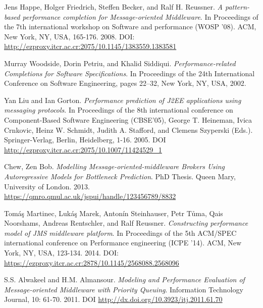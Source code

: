 \documentclass[article]{IEEEtran}
\begin{document}
\begin{thebibliography}{00}
 Jens Happe, Holger Friedrich, Steffen Becker, and Ralf H. Reussner. \emph{A pattern-based performance completion for Message-oriented Middleware}. In Proceedings of the 7th international workshop on Software and performance (WOSP '08). ACM, New York, NY, USA, 165-176. 2008. DOI: \url{http://ezproxy.itcr.ac.cr:2075/10.1145/1383559.1383581} 

 Murray Woodside, Dorin Petriu, and Khalid Siddiqui. \emph{Performance-related Completions for Software Specifications}. In Proceedings of the 24th International Conference on Software Engineering, pages 22–32, New York, NY, USA, 2002.


 Yan Liu and Ian Gorton. \emph{Performance prediction of J2EE applications using messaging protocols}. In Proceedings of the 8th international conference on Component-Based Software Engineering (CBSE'05), George T. Heineman, Ivica Crnkovic, Heinz W. Schmidt, Judith A. Stafford, and Clemens Szyperski (Eds.). Springer-Verlag, Berlin, Heidelberg, 1-16. 2005. DOI \url{http://ezproxy.itcr.ac.cr:2075/10.1007/11424529_1}

 Chew, Zen Bob. \emph{Modelling Message-oriented-middleware Brokers Using Autoregressive Models for Bottleneck Prediction}. PhD Thesis. Queen Mary, University of London. 2013. \url{https://qmro.qmul.ac.uk/jspui/handle/123456789/8832}

 Tomáş Martinec, Lukáş Marek, Antonín Steinhauser, Petr Tůma, Qais Noorshams, Andreas Rentschler, and Ralf Reussner. \emph{Constructing performance model of JMS middleware platform}. In Proceedings of the 5th ACM/SPEC international conference on Performance engineering (ICPE '14). ACM, New York, NY, USA, 123-134. 2014. DOI: \url{https://ezproxy.itcr.ac.cr:2878/10.1145/2568088.2568096}

 S.S. Alwakeel and H.M. Almansour. \emph{Modeling and Performance Evaluation of Message-oriented Middleware with Priority Queuing}. Information Technology Journal, 10: 61-70. 2011. DOI \url{http://dx.doi.org/10.3923/itj.2011.61.70}


\end{thebibliography}
\end{document}
